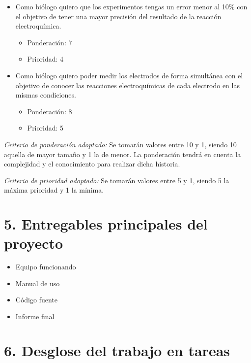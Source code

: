 \documentclass[11pt]{charter}
\begin{document}
\begin{itemize}
\item Como biólogo quiero que los experimentos tengas un error menor al 10\% con el objetivo de tener una mayor precisión del resultado de la reacción electroquímica.
\begin{itemize}
\item Ponderación: 7
\item Prioridad: 4
\end{itemize}

\item Como biólogo quiero poder medir los electrodos de forma simultánea con el objetivo de conocer las reacciones electroquímicas de cada electrodo en las mismas condiciones.
\begin{itemize}
\item Ponderación: 8
\item Prioridad: 5
\end{itemize}

\end{itemize}

\emph{Criterio de ponderación adoptado:} Se tomarán valores entre 10 y 1, siendo 10 aquella de mayor tamaño y 1 la de menor. La ponderación tendrá en cuenta la complejidad y el conocimiento para realizar dicha historia.

\emph{Criterio de prioridad adoptado:} Se tomarán valores entre 5 y 1, siendo 5 la máxima prioridad y 1 la mínima.

\section{5. Entregables principales del proyecto}
\label{sec:entregables}

\begin{itemize}
\item Equipo funcionando
\item Manual de uso
\item Código fuente
\item Informe final

\end{itemize}


\section{6. Desglose del trabajo en tareas}
\label{sec:wbs}
\end{document}
